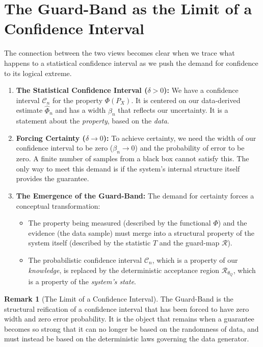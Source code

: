 \documentclass[12pt]{article}
\theoremstyle{definition}
\newtheorem{remark}{Remark}[section]
\theoremstyle{plain}
\begin{document}
\section{The Guard-Band as the Limit of a Confidence Interval}

The connection between the two views becomes clear when we trace what happens to a statistical confidence interval as we push the demand for confidence to its logical extreme.

\begin{enumerate}
    \item \textbf{The Statistical Confidence Interval ($\delta > 0$):} We have a confidence interval $\mathcal{C}_n$ for the property $\Phi(P_X)$. It is centered on our data-derived estimate $\widehat{\Phi}_n$ and has a width $\beta_n$ that reflects our uncertainty. It is a statement about the \emph{property}, based on the \emph{data}.

    \item \textbf{Forcing Certainty ($\delta \to 0$):} To achieve certainty, we need the width of our confidence interval to be zero ($\beta_n \to 0$) and the probability of error to be zero. A finite number of samples from a black box cannot satisfy this. The only way to meet this demand is if the system's internal structure itself provides the guarantee.

    \item \textbf{The Emergence of the Guard-Band:} The demand for certainty forces a conceptual transformation:
        \begin{itemize}
            \item The property being measured (described by the functional $\Phi$) and the evidence (the data sample) must merge into a structural property of the system itself (described by the statistic $T$ and the guard-map $\mathcal{R}$).
            \item The probabilistic confidence interval $\mathcal{C}_n$, which is a property of our \emph{knowledge}, is replaced by the deterministic acceptance region $\mathcal{R}_{\theta_Q}$, which is a property of the \emph{system's state}.
        \end{itemize}
\end{enumerate}

\begin{remark}[The Limit of a Confidence Interval]
The Guard-Band is the structural reification of a confidence interval that has been forced to have zero width and zero error probability. It is the object that remains when a guarantee becomes so strong that it can no longer be based on the randomness of data, and must instead be based on the deterministic laws governing the data generator.
\end{remark}
\end{document}
